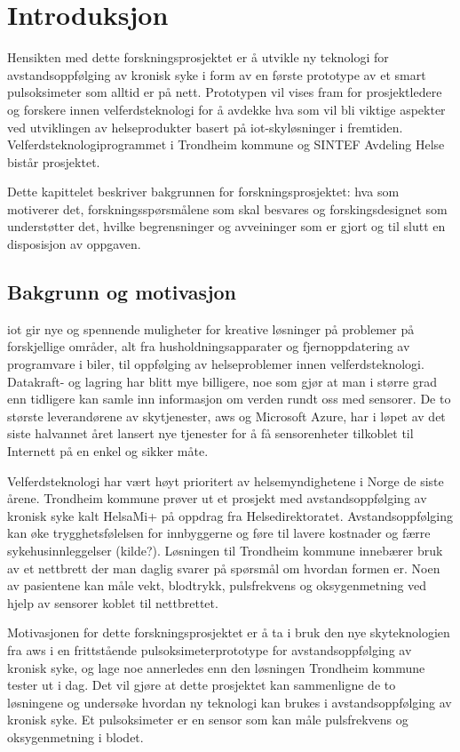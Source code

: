 \chapter{Introduksjon}
\label{ch:introduction}
Hensikten med dette forskningsprosjektet er å utvikle ny teknologi for avstandsoppfølging av kronisk
syke i form av en første prototype av et smart pulsoksimeter som alltid er på nett. Prototypen
vil vises fram for prosjektledere og forskere innen velferdsteknologi for
å avdekke hva som vil bli viktige aspekter ved utviklingen av helseprodukter
basert på \gls{iot}-skyløsninger i fremtiden. Velferdsteknologiprogrammet i Trondheim kommune og
SINTEF Avdeling Helse bistår prosjektet. 

Dette kapittelet beskriver bakgrunnen for forskningsprosjektet: hva som motiverer det,
forskningsspørsmålene som skal besvares og forskingsdesignet som understøtter det,
hvilke begrensninger og avveininger som er gjort og til slutt en disposisjon av oppgaven.

\section{Bakgrunn og motivasjon}
\gls{iot} gir nye og spennende muligheter for kreative løsninger på problemer på forskjellige områder, alt fra husholdningsapparater
og fjernoppdatering av programvare i biler, til oppfølging av helseproblemer innen velferdsteknologi. Datakraft- og lagring
har blitt mye billigere, noe som gjør at man i større grad enn tidligere kan samle inn informasjon om verden rundt oss
med sensorer. De to største leverandørene av skytjenester, \gls{aws} og Microsoft Azure,
har i løpet av det siste halvannet året lansert nye tjenester for å få sensorenheter tilkoblet til Internett
på en enkel og sikker måte.

Velferdsteknologi har vært høyt prioritert av helsemyndighetene i Norge de siste årene. Trondheim kommune prøver ut
et prosjekt med avstandsoppfølging av kronisk syke kalt HelsaMi+ på oppdrag fra Helsedirektoratet. 
Avstandsoppfølging kan øke trygghetsfølelsen for innbyggerne og føre til lavere kostnader og færre sykehusinnleggelser (kilde?).
Løsningen til Trondheim kommune innebærer bruk av et nettbrett der man daglig svarer på spørsmål om hvordan formen er. Noen av pasientene
kan måle vekt, blodtrykk, pulsfrekvens og oksygenmetning ved hjelp av sensorer koblet til nettbrettet.

Motivasjonen for dette forskningsprosjektet er å ta i bruk den nye skyteknologien fra \gls{aws} i en frittstående
pulsoksimeterprototype for avstandsoppfølging av kronisk syke, og lage noe annerledes enn den løsningen Trondheim
kommune tester ut i dag. Det vil gjøre at dette prosjektet kan sammenligne de to løsningene og undersøke hvordan ny
teknologi kan brukes i avstandsoppfølging av kronisk syke. Et pulsoksimeter er en sensor som kan måle pulsfrekvens og oksygenmetning i blodet.

